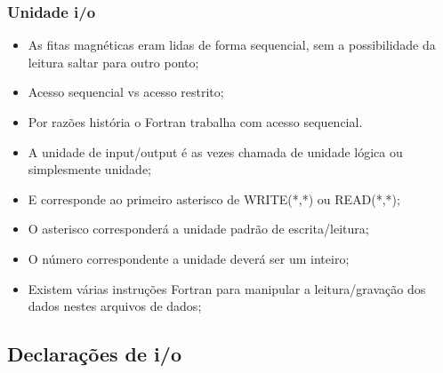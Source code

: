 \documentclass[notes=show]{beamer}
\begin{document}
\begin{frame}%

\frametitle{Unidade i/o}

\begin{itemize}
\item As fitas magnéticas eram lidas de forma sequencial, sem a possibilidade da leitura saltar para outro ponto;
	
\item Acesso sequencial vs acesso restrito;
	
\item Por raz\~{o}es hist\'{o}ria o Fortran trabalha com acesso sequencial.
\item A unidade de input/output \'{e} as vezes chamada de unidade l\'{o}gica
ou simplesmente unidade;

\item E corresponde ao primeiro asterisco de WRITE(*,*) ou READ(*,*);

\item O asterisco corresponder\'{a} a unidade padr\~{a}o de escrita/leitura;

\item O n\'{u}mero correspondente a unidade dever\'{a} ser um inteiro;

\item Existem v\'{a}rias instru\c{c}\~{o}es Fortran para manipular a
leitura/grava\c{c}\~{a}o dos dados nestes arquivos de dados;
\end{itemize}

\end{frame}%

\subsection{Declara\c{c}\~{o}es de i/o}
\end{document}
